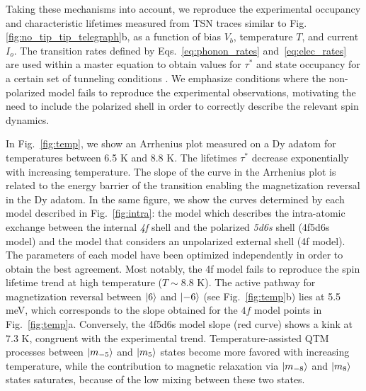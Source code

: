 \documentclass[
reprint,amsmath,amssymb,aps]{revtex4-2}
\begin{document}
Taking these mechanisms into account, we reproduce the experimental occupancy and characteristic lifetimes measured from TSN traces similar to Fig. \ref{fig:no_tip_tip_telegraph}b, as a function of bias $V_{b}$, temperature $T$, and current $I_{o}$. The transition rates defined by Eqs.~\ref{eq:phonon_rates} and~\ref{eq:elec_rates} are used within a master equation to obtain values for $\tau^*$ and state occupancy for a certain set of tunneling conditions \cite{delgado2010,Khajetoorians2013,loth2010,cervetti2016}. We emphasize conditions where the non-polarized model fails to reproduce the experimental observations, motivating the need to include the polarized shell in order to correctly describe the relevant spin dynamics.

In Fig.~\ref{fig:temp}, we show an Arrhenius plot measured on a Dy adatom for temperatures between 6.5 K and 8.8 K. The lifetimes $\tau^*$ decrease exponentially with increasing temperature. The slope of the curve in the Arrhenius plot is related to the energy barrier of the transition enabling the magnetization reversal in the Dy adatom. In the same figure, we show the curves determined by each model described in Fig.~\ref{fig:intra}: the model which describes the intra-atomic exchange between the internal \textit{4f} shell and the polarized \textit{5d6s} shell (4f5d6s model) and the model that considers an unpolarized external shell (4f model). The parameters of each model have been optimized independently in order to obtain the best agreement. Most notably, the 4f model fails to reproduce the spin lifetime trend at high temperature ($T\sim 8.8$ K). The active pathway for magnetization reversal between $\ket{6}$ and $\ket{-6}$ (see Fig.~\ref{fig:temp}b) lies at 5.5 meV, which corresponds to the slope obtained for the $4f$ model points in Fig.~\ref{fig:temp}a. Conversely, the 4f5d6s model slope (red curve) shows a kink at 7.3 K, congruent with the experimental trend. Temperature-assisted QTM processes between $\ket{m_{-5}}$ and $\ket{m_{5}}$ states become more favored with increasing temperature, while the contribution to magnetic relaxation via $\ket{m_{-8}}$ and $\ket{m_{8}}$ states saturates, because of the low mixing between these two states.
\end{document}
